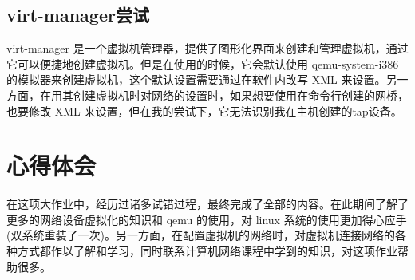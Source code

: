 \documentclass[UTF8,12pt]{ctexart}
\numberwithin{equation}{section}
\begin{document}
\subsection{virt-manager尝试}
virt-manager 是一个虚拟机管理器，提供了图形化界面来创建和管理虚拟机，通过它可以便捷地创建虚拟机。但是在使用的时候，它会默认使用 qemu-system-i386 的模拟器来创建虚拟机，这个默认设置需要通过在软件内改写 XML
来设置。另一方面，在用其创建虚拟机时对网络的设置时，如果想要使用在命令行创建的网桥，也要修改 XML 来设置，但在我的尝试下，它无法识别我在主机创建的tap设备。

\section{心得体会}
在这项大作业中，经历过诸多试错过程，最终完成了全部的内容。在此期间了解了更多的网络设备虚拟化的知识和 qemu 的使用，对 linux 系统的使用更加得心应手 (双系统重装了一次)。另一方面，在配置虚拟机的网络时，对虚拟机连接网络的各种方式都作以了解和学习，同时联系计算机网络课程中学到的知识，对这项作业帮助很多。
\end{document}
